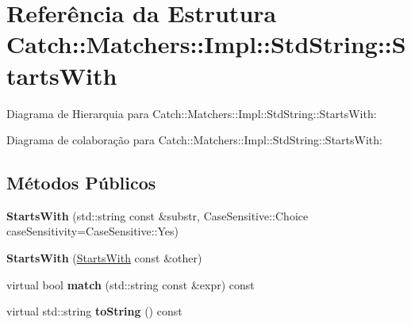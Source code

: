 \hypertarget{structCatch_1_1Matchers_1_1Impl_1_1StdString_1_1StartsWith}{}\section{Referência da Estrutura Catch\+:\+:Matchers\+:\+:Impl\+:\+:Std\+String\+:\+:Starts\+With}
\label{structCatch_1_1Matchers_1_1Impl_1_1StdString_1_1StartsWith}


Diagrama de Hierarquia para Catch\+:\+:Matchers\+:\+:Impl\+:\+:Std\+String\+:\+:Starts\+With\+:


Diagrama de colaboração para Catch\+:\+:Matchers\+:\+:Impl\+:\+:Std\+String\+:\+:Starts\+With\+:
\subsection*{Métodos Públicos}
\begin{DoxyCompactItemize}
\item 
{\bfseries Starts\+With} (std\+::string const \&substr, Case\+Sensitive\+::\+Choice case\+Sensitivity=Case\+Sensitive\+::\+Yes)\hypertarget{structCatch_1_1Matchers_1_1Impl_1_1StdString_1_1StartsWith_a0db1bd8876219464ae60346c9525bcf6}{}\label{structCatch_1_1Matchers_1_1Impl_1_1StdString_1_1StartsWith_a0db1bd8876219464ae60346c9525bcf6}

\item 
{\bfseries Starts\+With} (\hyperlink{structCatch_1_1Matchers_1_1Impl_1_1StdString_1_1StartsWith}{Starts\+With} const \&other)\hypertarget{structCatch_1_1Matchers_1_1Impl_1_1StdString_1_1StartsWith_a5526cb587632e7e46253d6f60ae01098}{}\label{structCatch_1_1Matchers_1_1Impl_1_1StdString_1_1StartsWith_a5526cb587632e7e46253d6f60ae01098}

\item 
virtual bool {\bfseries match} (std\+::string const \&expr) const \hypertarget{structCatch_1_1Matchers_1_1Impl_1_1StdString_1_1StartsWith_ae9c893adbacc853171a488aea5355653}{}\label{structCatch_1_1Matchers_1_1Impl_1_1StdString_1_1StartsWith_ae9c893adbacc853171a488aea5355653}

\item 
virtual std\+::string {\bfseries to\+String} () const \hypertarget{structCatch_1_1Matchers_1_1Impl_1_1StdString_1_1StartsWith_a066fe10e74495cb556abc6895193ba97}{}\label{structCatch_1_1Matchers_1_1Impl_1_1StdString_1_1StartsWith_a066fe10e74495cb556abc6895193ba97}

\end{DoxyCompactItemize}
